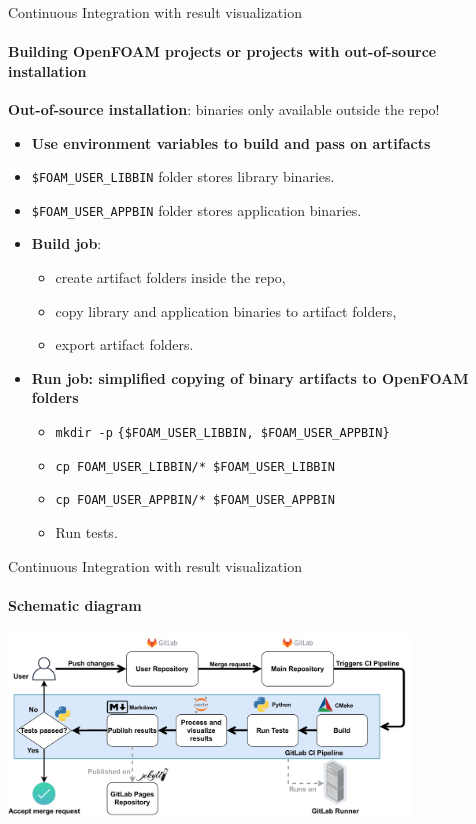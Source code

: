 \documentclass[
	aspectratio=169,%
	color={accentcolor=2d},
	logo=true,%
	colorframetitle=true,%
	]{tudabeamer}
\begin{document}
\begin{frame}[fragile]{Continuous Integration with result visualization} 
    \framesubtitle{Building OpenFOAM projects or projects with out-of-source installation}

    \vfill
    \textbf{Out-of-source installation}: binaries only available outside the repo! 
    \begin{itemize}
        \item \textbf{Use environment variables to build and pass on artifacts} 
        \item \texttt{\$FOAM\_USER\_LIBBIN} folder stores library binaries. 
        \item \texttt{\$FOAM\_USER\_APPBIN} folder stores application binaries. 
        \item \textbf{Build job}: 
            \begin{itemize}
                \item create artifact folders inside the repo, 
                \item copy library and application binaries to artifact folders, 
                \item export artifact folders. 
            \end{itemize}
        \item \textbf{Run job: \textbf{simplified} copying of binary artifacts to OpenFOAM folders}
            \begin{itemize} 
                \item \texttt{mkdir -p} \texttt{\{\$FOAM\_USER\_LIBBIN, \$FOAM\_USER\_APPBIN\}}
                \item \texttt{cp FOAM\_USER\_LIBBIN/* \$FOAM\_USER\_LIBBIN} 
                \item \texttt{cp FOAM\_USER\_APPBIN/* \$FOAM\_USER\_APPBIN} 
                \item Run tests.
            \end{itemize}
    \end{itemize}


\end{frame}

\begin{frame}{Continuous Integration with result visualization} 
	\framesubtitle{Schematic diagram}

	\centering
	\includegraphics[width=0.8\textwidth]{figures/ZINF-CI-diagram.pdf}

\end{frame}
\end{document}
